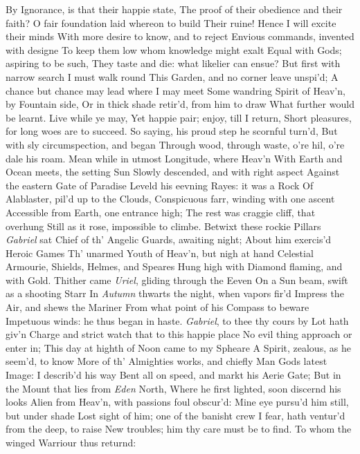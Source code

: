\documentclass[11pt]{book}
\newcounter {first}
\newcounter {last}
\begin{document}
By Ignorance, is that their happie state, 
The proof of their obedience and their faith? 
O fair foundation laid whereon to build 
Their ruine!  Hence I will excite their minds 
With more desire to know, and to reject 
Envious commands, invented with designe 
To keep them low whom knowledge might exalt 
Equal with Gods; aspiring to be such, 
They taste and die: what likelier can ensue? 
But first with narrow search I must walk round 
This Garden, and no corner leave unspi'd; 
A chance but chance may lead where I may meet 
Some wandring Spirit of Heav'n, by Fountain side, 
Or in thick shade retir'd, from him to draw 
What further would be learnt.  Live while ye may, 
Yet happie pair; enjoy, till I return, 
Short pleasures, for long woes are to succeed. 
\quad So saying, his proud step he scornful turn'd, 
But with sly circumspection, and began 
Through wood, through waste, o're hil, o're dale his roam. 
Mean while in utmost Longitude, where Heav'n 
With Earth and Ocean meets, the setting Sun 
Slowly descended, and with right aspect 
Against the eastern Gate of Paradise 
Leveld his eevning Rayes: it was a Rock 
Of Alablaster, pil'd up to the Clouds, 
Conspicuous farr, winding with one ascent 
Accessible from Earth, one entrance high; 
The rest was craggie cliff, that overhung 
Still as it rose, impossible to climbe. 
Betwixt these rockie Pillars \textit{Gabriel} sat 
Chief of th' Angelic Guards, awaiting night; 
About him exercis'd Heroic Games 
Th' unarmed Youth of Heav'n, but nigh at hand 
Celestial Armourie, Shields, Helmes, and Speares 
Hung high with Diamond flaming, and with Gold. 
Thither came \textit{Uriel}, gliding through the Eeven 
On a Sun beam, swift as a shooting Starr 
In \textit{Autumn} thwarts the night, when vapors fir'd 
Impress the Air, and shews the Mariner 
From what point of his Compass to beware 
Impetuous winds: he thus began in haste. 
\quad \textit{Gabriel}, to thee thy cours by Lot hath giv'n 
Charge and strict watch that to this happie place 
No evil thing approach or enter in; 
This day at highth of Noon came to my Spheare 
A Spirit, zealous, as he seem'd, to know 
More of th' Almighties works, and chiefly Man 
Gods latest Image: I describ'd his way 
Bent all on speed, and markt his Aerie Gate; 
But in the Mount that lies from \textit{Eden} North, 
Where he first lighted, soon discernd his looks 
Alien from Heav'n, with passions foul obscur'd: 
Mine eye pursu'd him still, but under shade 
Lost sight of him; one of the banisht crew 
I fear, hath ventur'd from the deep, to raise 
New troubles; him thy care must be to find. 
\quad To whom the winged Warriour thus returnd: 
\end{document}
